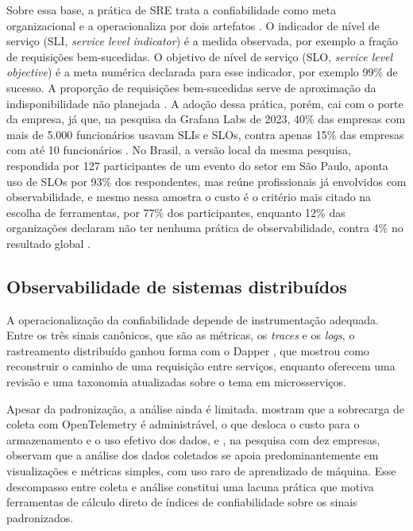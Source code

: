 \documentclass[12pt, a4paper, oneside]{article}
\begin{document}
Sobre essa base, a prática de SRE \cite{beyer2016sre} trata a confiabilidade como meta organizacional e a operacionaliza por dois artefatos \cite{jones2016slo}. O indicador de nível de serviço (SLI, \textit{service level indicator}) é a medida observada, por exemplo a fração de requisições bem-sucedidas. O objetivo de nível de serviço (SLO, \textit{service level objective}) é a meta numérica declarada para esse indicador, por exemplo 99\% de sucesso. A proporção de requisições bem-sucedidas serve de aproximação da indisponibilidade não planejada \cite{alvidrez2016risk}. A adoção dessa prática, porém, cai com o porte da empresa, já que, na pesquisa da Grafana Labs de 2023, 40\% das empresas com mais de 5.000 funcionários usavam SLIs e SLOs, contra apenas 15\% das empresas com até 10 funcionários \cite{grafana2023survey}. No Brasil, a versão local da mesma pesquisa, respondida por 127 participantes de um evento do setor em São Paulo, aponta uso de SLOs por 93\% dos respondentes, mas reúne profissionais já envolvidos com observabilidade, e mesmo nessa amostra o custo é o critério mais citado na escolha de ferramentas, por 77\% dos participantes, enquanto 12\% das organizações declaram não ter nenhuma prática de observabilidade, contra 4\% no resultado global \cite{grafana2025brasil}.

\subsection{Observabilidade de sistemas distribuídos}

A operacionalização da confiabilidade depende de instrumentação adequada. Entre os três sinais canônicos, que são as métricas, os \textit{traces} e os \textit{logs}, o rastreamento distribuído ganhou forma com o Dapper \cite{Sigelman2010}, que mostrou como reconstruir o caminho de uma requisição entre serviços, enquanto  oferecem uma revisão e uma taxonomia atualizadas sobre o tema em microsserviços.

Apesar da padronização, a análise ainda é limitada.  mostram que a sobrecarga de coleta com OpenTelemetry é administrável, o que desloca o custo para o armazenamento e o uso efetivo dos dados, e , na pesquisa com dez empresas, observam que a análise dos dados coletados se apoia predominantemente em visualizações e métricas simples, com uso raro de aprendizado de máquina. Esse descompasso entre coleta e análise constitui uma lacuna prática que motiva ferramentas de cálculo direto de índices de confiabilidade sobre os sinais padronizados.
\end{document}
